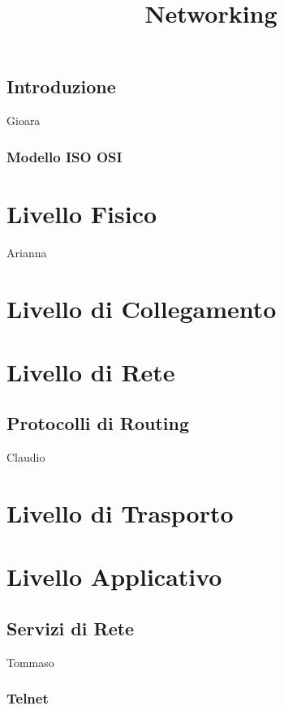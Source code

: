 \documentclass[a4paper,11pt]{paper}
\title{Networking}
\begin{document}
\maketitle
\tableofcontents
\newpage

\subsection{Introduzione}
Gioara
\subsubsection{Modello ISO OSI}
\newpage

\section{Livello Fisico}
Arianna
\newpage
\section{Livello di Collegamento}
\newpage
\section{Livello di Rete}
\subsection{Protocolli di Routing}
Claudio
\newpage
\section{Livello di Trasporto}
\newpage
\section{Livello Applicativo}
\subsection{Servizi di Rete}
Tommaso
\subsubsection{Telnet}
\end{document}
